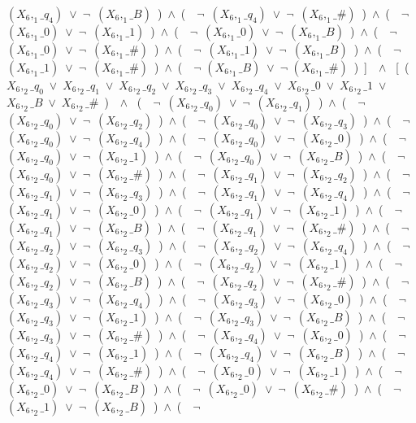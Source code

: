 ﻿\documentclass[a4paper,10pt]{article}
\begin{document}
$(X_6,_1\_q_4)$\ $\vee$\ $\neg$\ $(X_6,_1\_B)$\ )\ $\wedge$\ (\ \ $\neg$\ $(X_6,_1\_q_4)$\ $\vee$\ $\neg$\ $(X_6,_1\_\#)$\ )\ $\wedge$\ (\ \ $\neg$\ $(X_6,_1\_0)$\ $\vee$\ $\neg$\ $(X_6,_1\_1)$\ )\ $\wedge$\ (\ \ $\neg$\ $(X_6,_1\_0)$\ $\vee$\ $\neg$\ $(X_6,_1\_B)$\ )\ $\wedge$\ (\ \ $\neg$\ $(X_6,_1\_0)$\ $\vee$\ $\neg$\ $(X_6,_1\_\#)$\ )\ $\wedge$\ (\ \ $\neg$\ $(X_6,_1\_1)$\ $\vee$\ $\neg$\ $(X_6,_1\_B)$\ )\ $\wedge$\ (\ \ $\neg$\ $(X_6,_1\_1)$\ $\vee$\ $\neg$\ $(X_6,_1\_\#)$\ )\ $\wedge$\ (\ \ $\neg$ $(X_6,_1\_B)$\ $\vee$\ $\neg$ $(X_6,_1\_\#)$\ )\ ]\ \ $\wedge$ \ [\ (\ $X_6,_2\_q_0$\ $\vee$\ $X_6,_2\_q_1$\ $\vee$\ $X_6,_2\_q_2$\ $\vee$\ $X_6,_2\_q_3$\ $\vee$\ $X_6,_2\_q_4$\ $\vee$\ $X_6,_2\_0$\ $\vee$\ $X_6,_2\_1$\ $\vee$\ $X_6,_2\_B$\ $\vee$\ $X_6,_2\_\#$\ )\ \ $\wedge$ \ (\ \ $\neg$\ $(X_6,_2\_q_0)$\ $\vee$\ $\neg$\ $(X_6,_2\_q_1)$\ )\ $\wedge$\ (\ \ $\neg$\ $(X_6,_2\_q_0)$\ $\vee$\ $\neg$\ $(X_6,_2\_q_2)$\ )\ $\wedge$\ (\ \ $\neg$\ $(X_6,_2\_q_0)$\ $\vee$\ $\neg$\ $(X_6,_2\_q_3)$\ )\ $\wedge$\ (\ \ $\neg$\ $(X_6,_2\_q_0)$\ $\vee$\ $\neg$\ $(X_6,_2\_q_4)$\ )\ $\wedge$\ (\ \ $\neg$\ $(X_6,_2\_q_0)$\ $\vee$\ $\neg$\ $(X_6,_2\_0)$\ )\ $\wedge$\ (\ \ $\neg$\ $(X_6,_2\_q_0)$\ $\vee$\ $\neg$\ $(X_6,_2\_1)$\ )\ $\wedge$\ (\ \ $\neg$\ $(X_6,_2\_q_0)$\ $\vee$\ $\neg$\ $(X_6,_2\_B)$\ )\ $\wedge$\ (\ \ $\neg$\ $(X_6,_2\_q_0)$\ $\vee$\ $\neg$\ $(X_6,_2\_\#)$\ )\ $\wedge$\ (\ \ $\neg$\ $(X_6,_2\_q_1)$\ $\vee$\ $\neg$\ $(X_6,_2\_q_2)$\ )\ $\wedge$\ (\ \ $\neg$\ $(X_6,_2\_q_1)$\ $\vee$\ $\neg$\ $(X_6,_2\_q_3)$\ )\ $\wedge$\ (\ \ $\neg$\ $(X_6,_2\_q_1)$\ $\vee$\ $\neg$\ $(X_6,_2\_q_4)$\ )\ $\wedge$\ (\ \ $\neg$\ $(X_6,_2\_q_1)$\ $\vee$\ $\neg$\ $(X_6,_2\_0)$\ )\ $\wedge$\ (\ \ $\neg$\ $(X_6,_2\_q_1)$\ $\vee$\ $\neg$\ $(X_6,_2\_1)$\ )\ $\wedge$\ (\ \ $\neg$\ $(X_6,_2\_q_1)$\ $\vee$\ $\neg$\ $(X_6,_2\_B)$\ )\ $\wedge$\ (\ \ $\neg$\ $(X_6,_2\_q_1)$\ $\vee$\ $\neg$\ $(X_6,_2\_\#)$\ )\ $\wedge$\ (\ \ $\neg$\ $(X_6,_2\_q_2)$\ $\vee$\ $\neg$\ $(X_6,_2\_q_3)$\ )\ $\wedge$\ (\ \ $\neg$\ $(X_6,_2\_q_2)$\ $\vee$\ $\neg$\ $(X_6,_2\_q_4)$\ )\ $\wedge$\ (\ \ $\neg$\ $(X_6,_2\_q_2)$\ $\vee$\ $\neg$\ $(X_6,_2\_0)$\ )\ $\wedge$\ (\ \ $\neg$\ $(X_6,_2\_q_2)$\ $\vee$\ $\neg$\ $(X_6,_2\_1)$\ )\ $\wedge$\ (\ \ $\neg$\ $(X_6,_2\_q_2)$\ $\vee$\ $\neg$\ $(X_6,_2\_B)$\ )\ $\wedge$\ (\ \ $\neg$\ $(X_6,_2\_q_2)$\ $\vee$\ $\neg$\ $(X_6,_2\_\#)$\ )\ $\wedge$\ (\ \ $\neg$\ $(X_6,_2\_q_3)$\ $\vee$\ $\neg$\ $(X_6,_2\_q_4)$\ )\ $\wedge$\ (\ \ $\neg$\ $(X_6,_2\_q_3)$\ $\vee$\ $\neg$\ $(X_6,_2\_0)$\ )\ $\wedge$\ (\ \ $\neg$\ $(X_6,_2\_q_3)$\ $\vee$\ $\neg$\ $(X_6,_2\_1)$\ )\ $\wedge$\ (\ \ $\neg$\ $(X_6,_2\_q_3)$\ $\vee$\ $\neg$\ $(X_6,_2\_B)$\ )\ $\wedge$\ (\ \ $\neg$\ $(X_6,_2\_q_3)$\ $\vee$\ $\neg$\ $(X_6,_2\_\#)$\ )\ $\wedge$\ (\ \ $\neg$\ $(X_6,_2\_q_4)$\ $\vee$\ $\neg$\ $(X_6,_2\_0)$\ )\ $\wedge$\ (\ \ $\neg$\ $(X_6,_2\_q_4)$\ $\vee$\ $\neg$\ $(X_6,_2\_1)$\ )\ $\wedge$\ (\ \ $\neg$\ $(X_6,_2\_q_4)$\ $\vee$\ $\neg$\ $(X_6,_2\_B)$\ )\ $\wedge$\ (\ \ $\neg$\ $(X_6,_2\_q_4)$\ $\vee$\ $\neg$\ $(X_6,_2\_\#)$\ )\ $\wedge$\ (\ \ $\neg$\ $(X_6,_2\_0)$\ $\vee$\ $\neg$\ $(X_6,_2\_1)$\ )\ $\wedge$\ (\ \ $\neg$\ $(X_6,_2\_0)$\ $\vee$\ $\neg$\ $(X_6,_2\_B)$\ )\ $\wedge$\ (\ \ $\neg$\ $(X_6,_2\_0)$\ $\vee$\ $\neg$\ $(X_6,_2\_\#)$\ )\ $\wedge$\ (\ \ $\neg$\ $(X_6,_2\_1)$\ $\vee$\ $\neg$\ $(X_6,_2\_B)$\ )\ $\wedge$\ (\ \ $\neg$\ 
\end{document}
